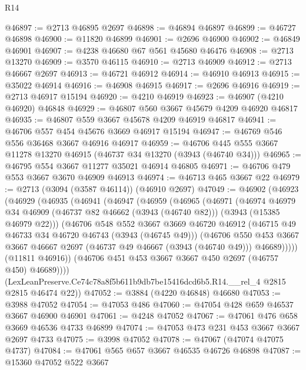 \begin{lexlean}{R14}
\begin{coremodule}
@46897 := @2713 @46895 @2697
@46898 := @46894 @46897
@46899 := @46727 @46898
@46900 := @11820 @46899
@46901 := @2696 @46900
@46902 := @46849 @46901
@46907 := @4238 @46680 @67 @561 @45680 @46476
@46908 := @2713 @13270
@46909 := @3570 @46115
@46910 := @2713 @46909
@46912 := @2713 @46667 @2697
@46913 := @46721 @46912
@46914 := @46910 @46913
@46915 := @35022 @46914
@46916 := @46908 @46915
@46917 := @2696 @46916
@46919 := @2713 @46917 @15194
@46920 := @4210 @46919
@46923 := @46907 (@4210 @46920) @46848
@46929 := @46807 @560 @3667 @45679 @4209 @46920 @46817
@46935 := @46807 @559 @3667 @45678 @4209 @46919 @46817
@46941 := @46706 @557 @454 @45676 @3669 @46917 @15194
@46947 := @46769 @546 @556 @36468 @3667 @46916 @46917
@46959 := @46706 @445 @555 @3667 @11278 @13270 @46915 (@46737 @34 @13270 (@3943 (@46740 @34)))
@46965 := @46795 @554 @3667 @11277 @35021 @46914 @46805
@46971 := @46706 @479 @553 @3667 @3670 @46909 @46913
@46974 := @46713 @465 @3667 @22
@46979 := @2713 (@3094 (@3587 @46114)) (@46910 @2697)
@47049 := @46902
    (@46923
      (@46929
        (@46935
          (@46941
            (@46947
              (@46959
                (@46965
                  (@46971
                    (@46974
                      @46979
                      @34
                      @46909
                      (@46737 @82 @46662 (@3943 (@46740 @82)))
                      (@3943 (@15385 @46979 @22)))
                    (@46706
                      @548
                      @552
                      @3667
                      @3669
                      @46720
                      @46912
                      (@46715 @49 @46733 @34 @46720 @46743 (@3943 (@46745 @49)))
                      (@46706
                        @550
                        @453
                        @3667
                        @3667
                        @46667
                        @2697
                        (@46737 @49 @46667 (@3943 (@46740 @49)))
                        @46689)))))
              (@11811 @46916))
            (@46706 @451 @453 @3667 @3667 @450 @2697 (@46757 @450) @46689))))
      (LexLeanPreserve.Ce74c78a8f5b611b9db7be15416dcd6b5.R14.__rel_4 @2815 @2815 @46474 @22))
@47052 := @3884 (@4220 @46848) @46680
@47053 := @3988 @47052
@47054 := @47053 @486
@47060 := @47054 @428 @659 @46537 @3667 @46900 @46901
@47061 := @4248 @47052
@47067 := @47061 @476 @658 @3669 @46536 @4733 @46899
@47074 := @47053 @473 @231 @453 @3667 @3667 @2697 @4733
@47075 := @3998 @47052
@47078 := @47067 (@47074 @47075 @4737)
@47084 := @47061 @565 @657 @3667 @46535 @46726 @46898
@47087 := @15360 @47052 @522 @3667

\end{coremodule}
\end{lexlean}
